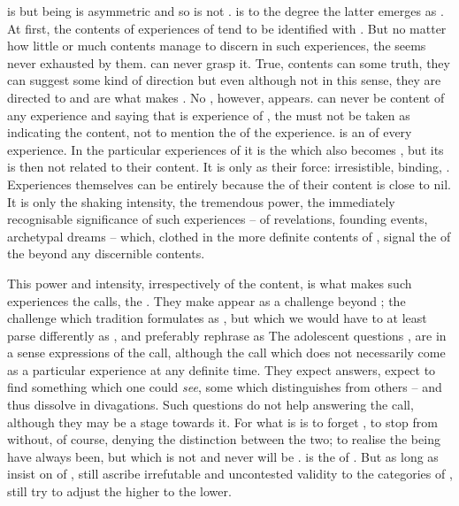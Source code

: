 \pa {} is  but being is asymmetric and so  is not
.  is  to the degree the latter emerges as
.  At first, the contents of experiences of  tend to be
identified with . But no matter how little or much contents 
manage to discern in such experiences, the  seems never exhausted by
them.  can never grasp it.  True, contents can  some truth,
they can suggest some kind of direction but even although not  in this
sense, they are directed to  and are what makes  .
No , however, appears.   can never be content of any
experience and saying that  is  experience of , the
 must not be taken as indicating the content, not to mention the
 of the experience.   is an  of every
experience.  In the particular experiences of
 it is the  which also becomes , but its
 is then not related to their content. It is  only
as their force: irresistible, binding, . Experiences themselves can 
be entirely  because the  of their content is close to
nil.  It is only the shaking intensity, the tremendous power, the immediately
recognisable significance of such experiences -- of revelations, founding
events, {archetypal dreams} -- which, clothed in the more definite contents of
, signal the  of the  beyond any
discernible contents.

This power and intensity, irrespectively of the content, is what makes such
experiences the {calls}, the .  They make  appear as a
challenge beyond ; the challenge which tradition formulates as
, but which we would have to at least parse differently as
, and preferably rephrase as   The
adolescent questions ,  are in
a sense {expressions} of the call, although the call which does not necessarily
come as a particular experience at any definite time. They expect answers,
expect to find something which one could {\em see}, some  
which distinguishes  from others -- and thus dissolve in 
divagations. Such questions do not help answering the call, although they may be
a stage towards it. For what is  is to forget , to
stop   from  without, of course, denying
the distinction between the two; to realise the being  have always been,
but which is not and never will be .   is the  of
. But as long as  insist on  of , 
still ascribe irrefutable and uncontested validity to the categories of
,  still try to adjust the higher to the lower.


